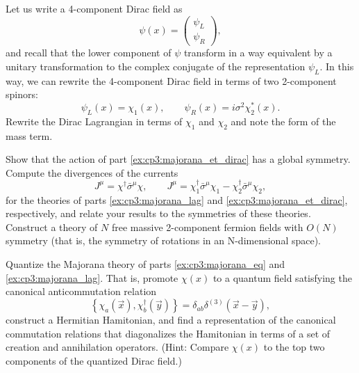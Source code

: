 \begin{problembody}
    \item \label{ex:cp3:majorana_et_dirac} Let us write a 4-component Dirac field as 
    \begin{equation*}
        \psi(x) = \begin{pmatrix}
            \psi_L \\ \psi_R
        \end{pmatrix},
    \end{equation*}
    and recall that the lower component of $\psi$ transform in a way equivalent by a unitary transformation to the complex conjugate of the representation $\psi_L$. 
    In this way, we can rewrite the 4-component Dirac field in terms of two 2-component spinors:
    \begin{equation*}
        \psi_L(x) = \chi_1(x), \qquad \psi_R(x) = i\sigma^2 \chi^\ast_2(x).
    \end{equation*}
    Rewrite the Dirac Lagrangian in terms of $\chi_1$ and $\chi_2$ and note the form of the mass term.

    \item Show that the action of part \ref{ex:cp3:majorana_et_dirac} has a global symmetry. Compute the divergences of the currents
    \begin{equation*}
        J^\mu = \chi^\dagger \bar{\sigma}^\mu \chi, \qquad J^\mu = \chi_1^\dagger \bar{\sigma}^\mu \chi_1 - \chi_2^\dagger \bar{\sigma}^\mu \chi_2,
    \end{equation*}
    for the theories of parts \ref{ex:cp3:majorana_lag} and \ref{ex:cp3:majorana_et_dirac}, respectively, and relate your results to the symmetries of these theories. 
    Construct a theory of $N$ free massive 2-component fermion fields with $O(N)$ symmetry (that is, the symmetry of rotations in an N-dimensional space).

    \item Quantize the Majorana theory of parts \ref{ex:cp3:majorana_eq} and \ref{ex:cp3:majorana_lag}. That is, promote $\chi(x)$ to a quantum field satisfying the 
    canonical anticommutation relation
    \begin{equation*}
        \left\{\chi_a(\vec{x}), \chi_b^\dagger(\vec{y})\right\} = \delta_{ab}\delta^{(3)}(\vec{x} - \vec{y}),
    \end{equation*}
    construct a Hermitian Hamitonian, and find a representation of the canonical commutation relations that diagonalizes the Hamitonian in terms of a set of creation 
    and annihilation operators. (Hint: Compare $\chi(x)$ to the top two components of the quantized Dirac field.)
\end{problembody}

